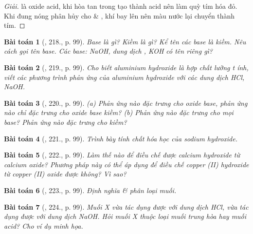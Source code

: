 \documentclass{article}
\newtheorem{baitoan}{Bài toán}
\begin{document}
\begin{proof}[Giải]
	 là oxide acid, khi hòa tan trong  tạo thành acid  nên làm quỳ tím hóa đỏ. Khi đung nóng  phân hủy cho  \& , khí  bay lên nên màu nước lại chuyển thành tím.
\end{proof}

\begin{baitoan}[\cite{Nguyen_Buu_Can_500_BT_Hoa_Hoc_THCS}, 218., p. 99]
	Base là gì? Kiềm là gì? Kể tên các base là kiềm. Nêu cách gọi tên base. Các base: {\rm NaOH}, dung dịch {\rm{}, KOH} có tên riêng gì?
\end{baitoan}

\begin{baitoan}[\cite{Nguyen_Buu_Can_500_BT_Hoa_Hoc_THCS}, 219., p. 99]
	Cho biết aluminium hydroxide là hợp chất lưỡng t ính, viết các phương trình phản ứng của aluminium hydroxide với các dung dịch {\rm HCl, NaOH}.
\end{baitoan}

\begin{baitoan}[\cite{Nguyen_Buu_Can_500_BT_Hoa_Hoc_THCS}, 220., p. 99]
	(a) Phản ứng nào đặc trưng cho oxide base, phản ứng nào chỉ đặc trưng cho oxide base kiềm? (b) Phản ứng nào đặc trưng cho mọi base? Phản ứng nào đặc trưng cho kiềm?
\end{baitoan}

\begin{baitoan}[\cite{Nguyen_Buu_Can_500_BT_Hoa_Hoc_THCS}, 221., p. 99]
	Trình bày tính chất hóa học của sodium hydroxide.
\end{baitoan}

\begin{baitoan}[\cite{Nguyen_Buu_Can_500_BT_Hoa_Hoc_THCS}, 222., p. 99]
	Làm thế nào để điều chế được calcium hydroxide từ calcium oxide? Phương pháp này có thể áp dụng để điều chế copper ({\rm II}) hydroxide từ copper ({\rm II}) oxide được không? Vì sao?
\end{baitoan}

\begin{baitoan}[\cite{Nguyen_Buu_Can_500_BT_Hoa_Hoc_THCS}, 223., p. 99]
	Định nghĩa \& phân loại muối.
\end{baitoan}

\begin{baitoan}[\cite{Nguyen_Buu_Can_500_BT_Hoa_Hoc_THCS}, 224., p. 99]
	Muối X vừa tác dụng được với dung dịch {\rm HCl}, vừa tác dụng được với dung dịch {\rm NaOH}. Hỏi muối X thuộc loại muối trung hòa hay muối acid? Cho ví dụ minh họa.
\end{baitoan}
\end{document}
